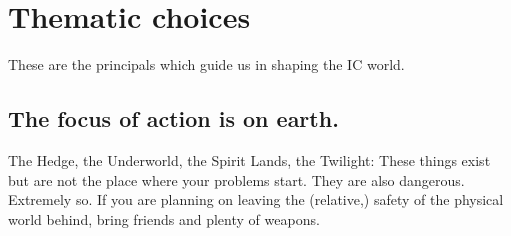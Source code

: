 \section{Thematic choices}
These are the principals which guide us in shaping the IC world.
\subsection{The focus of action is on earth.}
The Hedge, the Underworld, the Spirit Lands, the Twilight: These things exist but are not the place where your problems start.
They are also dangerous.
Extremely so. 
If you are planning on leaving the (relative,) safety of the physical world behind, bring friends and plenty of weapons.
